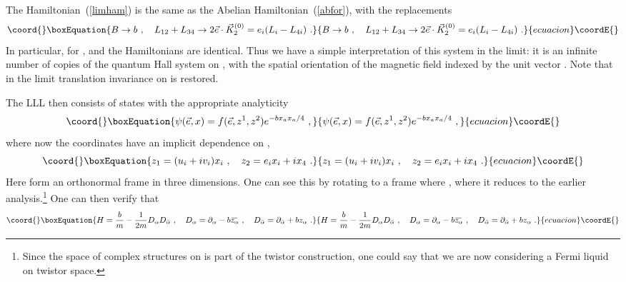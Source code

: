 \documentclass[a4paper,12pt]{article}
\providecommand{\R}{R}
\providecommand{\OL}[1]{ \hspace{1pt}\overline{\hspace{-1pt}#1
   \hspace{-2pt}}\hspace{2pt} }
\begin{document}
The Hamiltonian~(\ref{limham}) is the same as the Abelian
Hamiltonian~(\ref{abfor}), with the replacements
\begin{equation}\coord{}\boxEquation{
B \to b\ ,\quad L_{12} + L_{34} \to 2 \vec e \cdot \vec K_2^{(0)}
= e_i (L_i -  L_{4i})\ .
}{
B \to b\ ,\quad L_{12} + L_{34} \to 2 \vec e \cdot \vec K_2^{(0)}
= e_i (L_i -  L_{4i})\ .
}{ecuacion}\coordE{}\end{equation}
In particular, for \coordHE{}, \coordHE{} and the Hamiltonians are identical.  Thus we have a simple
interpretation of this system in the \coordHE{} limit: it is an infinite
number of copies of the \coordHE{} quantum Hall system on \myHighlight{$\R^4$}\coordHE{}, with the
spatial orientation of the magnetic field indexed by the unit vector \coordHE{}.  Note that in the limit translation invariance on \myHighlight{$\R^4$}\coordHE{} is restored.

The LLL then consists of states with the appropriate analyticity 
\begin{equation}\coord{}\boxEquation{
\psi(\vec  e, x) = 
f(\vec e, z^1,z^2) e^{-b x_a x_a/4}\ ,
}{
\psi(\vec  e, x) = 
f(\vec e, z^1,z^2) e^{-b x_a x_a/4}\ ,
}{ecuacion}\coordE{}\end{equation}
where now the coordinates \coordHE{} have an implicit dependence on \coordHE{},
\begin{equation}\coord{}\boxEquation{
z_1 = (u_i+ i v_i) x_i\ ,\quad z_2 = e_i x_i + i x_4\ .
}{
z_1 = (u_i+ i v_i) x_i\ ,\quad z_2 = e_i x_i + i x_4\ .
}{ecuacion}\coordE{}\end{equation}
Here \coordHE{} form an orthonormal frame in three dimensions.
One can see this by rotating to a frame where \coordHE{}, where it
reduces to the earlier
\coordHE{} analysis.\footnote
{Since the space of complex structures on \myHighlight{$\R^4$}\coordHE{} is part of the twistor
construction, one could say that we are now considering a Fermi liquid on
twistor space.}
One can then verify that
\begin{equation}\coord{}\boxEquation{
H = \frac{b}{m} - \frac{1}{2m} D_{\alpha} D_{\bar \alpha}
\ ,\quad D_{\alpha} = \partial_{\alpha} - b \OL{ z_\alpha}\ ,\quad
D_{\bar\alpha} = \partial_{\bar\alpha} + b z_\alpha\ .
}{
H = \frac{b}{m} - \frac{1}{2m} D_{\alpha} D_{\bar \alpha}
\ ,\quad D_{\alpha} = \partial_{\alpha} - b \OL{ z_\alpha}\ ,\quad
D_{\bar\alpha} = \partial_{\bar\alpha} + b z_\alpha\ .
}{ecuacion}\coordE{}\end{equation}
\end{document}
